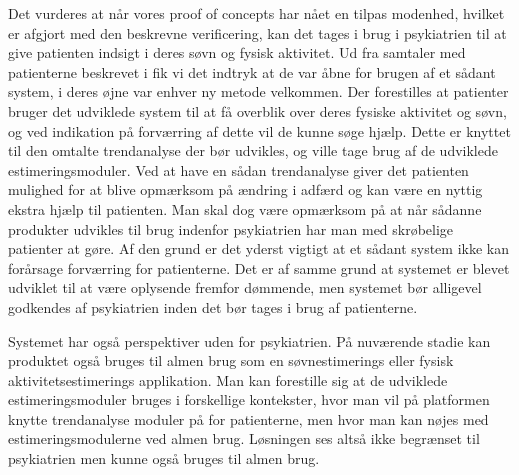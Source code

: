 Det vurderes at når vores proof of concepts har nået en tilpas modenhed, hvilket er afgjort med den beskrevne verificering, kan det tages i brug i psykiatrien til at give patienten indsigt i deres søvn og fysisk aktivitet. 
Ud fra samtaler med patienterne beskrevet i \citet{misc:faellesrapp} fik vi det indtryk at de var åbne for brugen af et sådant system, i deres øjne var enhver ny metode velkommen.
Der forestilles at patienter bruger det udviklede system til at få overblik over deres fysiske aktivitet og søvn, og ved indikation på forværring af dette vil de kunne søge hjælp. 
Dette er knyttet til den omtalte trendanalyse der bør udvikles, og ville tage brug af de udviklede estimeringsmoduler.
Ved at have en sådan trendanalyse giver det patienten mulighed for at blive opmærksom på ændring i adfærd og kan være en nyttig ekstra hjælp til patienten.
Man skal dog være opmærksom på at når sådanne produkter udvikles til brug indenfor psykiatrien har man med skrøbelige patienter at gøre.
Af den grund er det yderst vigtigt at et sådant system ikke kan forårsage forværring for patienterne.
Det er af samme grund at systemet er blevet udviklet til at være oplysende fremfor dømmende, men systemet bør alligevel godkendes af psykiatrien inden det bør tages i brug af patienterne.

Systemet har også perspektiver uden for psykiatrien.
På nuværende stadie kan produktet også bruges til almen brug som en søvnestimerings eller fysisk aktivitetsestimerings applikation.
Man kan forestille sig at de udviklede estimeringsmoduler bruges i forskellige kontekster, hvor man vil på platformen knytte trendanalyse moduler på for patienterne, men hvor man kan nøjes med estimeringsmodulerne ved almen brug.
Løsningen ses altså ikke begrænset til psykiatrien men kunne også bruges til almen brug.

